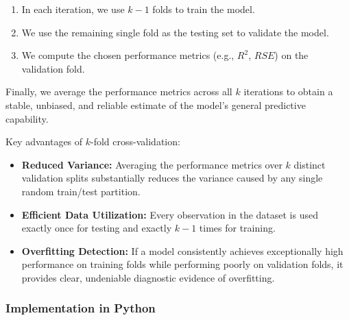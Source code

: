\begin{enumerate}
	\item In each iteration, we use $k - 1$ folds to train the model.
	\item We use the remaining single fold as the testing set to validate the model.
	\item We compute the chosen performance metrics (e.g., $R^2$, $RSE$) on the validation fold.
\end{enumerate}

Finally, we average the performance metrics across all $k$ iterations to obtain a stable, unbiased, and reliable estimate of the model's general predictive capability.

\begin{observacion}
	Key advantages of $k$-fold cross-validation:
	\begin{itemize}
		\item \textbf{Reduced Variance:} Averaging the performance metrics over $k$ distinct validation splits substantially reduces the variance caused by any single random train/test partition.
		\item \textbf{Efficient Data Utilization:} Every observation in the dataset is used exactly once for testing and exactly $k - 1$ times for training.
		\item \textbf{Overfitting Detection:} If a model consistently achieves exceptionally high performance on training folds while performing poorly on validation folds, it provides clear, undeniable diagnostic evidence of overfitting.
	\end{itemize}
\end{observacion}

\subsubsection{Implementation in Python}


